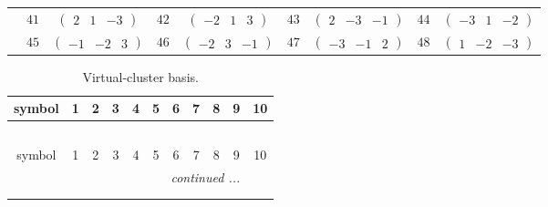 \documentclass[fleqn,10pt,landscape]{article}
\begin{document}
\begin{itemize}
{\begin{center}
\begin{longtable}{ccccccccc}
& $ 41 $ & $ \begin{pmatrix} 2 & 1 & -3 \end{pmatrix} $ & $ 42 $ & $ \begin{pmatrix} -2 & 1 & 3 \end{pmatrix} $ & $ 43 $ & $ \begin{pmatrix} 2 & -3 & -1 \end{pmatrix} $ & $ 44 $ & $ \begin{pmatrix} -3 & 1 & -2 \end{pmatrix} $ \\
& $ 45 $ & $ \begin{pmatrix} -1 & -2 & 3 \end{pmatrix} $ & $ 46 $ & $ \begin{pmatrix} -2 & 3 & -1 \end{pmatrix} $ & $ 47 $ & $ \begin{pmatrix} -3 & -1 & 2 \end{pmatrix} $ & $ 48 $ & $ \begin{pmatrix} 1 & -2 & -3 \end{pmatrix} $ \\
\end{longtable}
\end{center}
\begin{center}
\renewcommand{\arraystretch}{1.7}
\begin{longtable}{ccccccccccc}
\caption{Virtual-cluster basis.}
 \\
 \hline \hline
symbol & 1 & 2 & 3 & 4 & 5 & 6 & 7 & 8 & 9 & 10 \\ \hline \endfirsthead

\multicolumn{10}{l}{\tablename\ \thetable{}} \\
 \hline \hline
symbol & 1 & 2 & 3 & 4 & 5 & 6 & 7 & 8 & 9 & 10 \\ \hline \endhead

 \hline \hline
\multicolumn{10}{r}{\footnotesize\it continued ...} \\ \endfoot

 \hline \hline
\multicolumn{10}{r}{} \\ \endlastfoot


\end{longtable}
\end{center}}
\end{itemize}
\end{document}
